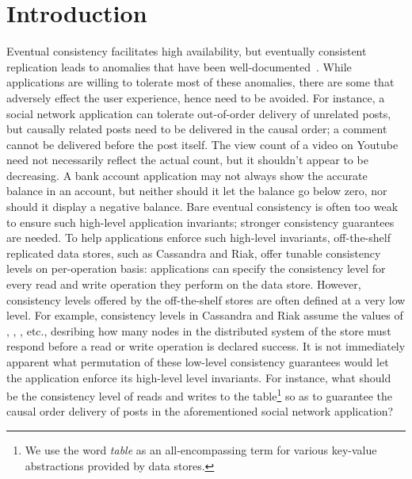 \section{Introduction}
\label{sec:intro}

Eventual consistency facilitates high availability, but eventually
consistent replication leads to anomalies that have been
well-documented~\cite{Burckhardt2014, pldi15, Session, Dynamo,
RedBlue}. While applications are willing to tolerate most of these
anomalies, there are some that adversely effect the user experience,
hence need to be avoided. For instance, a social network application
can tolerate out-of-order delivery of unrelated posts, but causally
related posts need to be delivered in the causal order; a comment
cannot be delivered before the post itself. The view count of a video
on Youtube need not necessarily reflect the actual count, but it
shouldn't appear to be decreasing. A bank account application may not
always show the accurate balance in an account, but neither should it
let the balance go below zero, nor should it display a negative
balance. Bare eventual consistency is often too weak to ensure such
high-level application invariants; stronger consistency guarantees are
needed. To help applications enforce such high-level invariants,
off-the-shelf replicated data stores, such as Cassandra and Riak,
offer tunable consistency levels on per-operation basis: applications
can specify the consistency level for every read and write operation
they perform on the data store. However, consistency levels offered by
the off-the-shelf stores are often defined at a very low level. For
example, consistency levels in Cassandra and Riak assume the values of
, , ,  etc., desribing how many nodes
in the distributed system of the store must respond before a read or
write operation is declared success. It is not immediately apparent
what permutation of these low-level consistency guarantees would let
the application enforce its high-level level invariants. For instance,
what should be the consistency level of reads and writes to the
 table\footnote{We use the word \emph{table} as an
all-encompassing term for various key-value abstractions provided by
data stores.} so as to guarantee the causal order delivery of posts in
the aforementioned social network application? 

